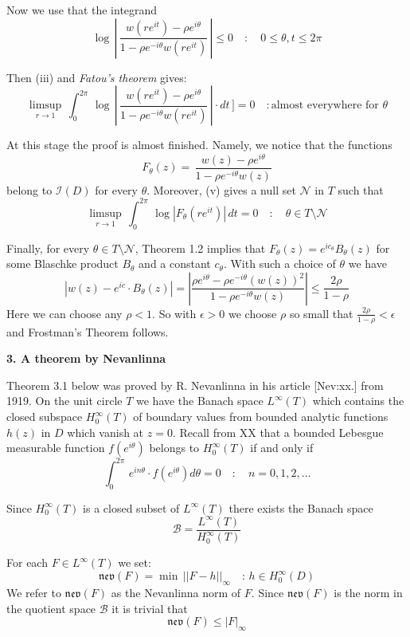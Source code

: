\documentclass{amsart}
\begin{document}
\noindent
Now we use that the  integrand
\[
\log\,|\,\frac{w(re^{it})-
\rho e^{i\theta}}{1-\rho e^{-i\theta}w(re^{it})}\,|\leq 0\quad\colon\quad
0\leq \theta,t\leq 2\pi\tag{iv}
\]
\medskip

\noindent
Then (iii) and  \emph{Fatou's theorem} gives:
\[
\limsup_{r\to 1}\,
\int_0^{2\pi}\,\log\,|
\,\frac{w(re^{it})-\rho e^{i\theta}}{1-\rho e^{-i\theta}w(re^{it})}\,|
\cdot dt\,]=0\quad\colon\text{almost everywhere for}\,\,\theta\tag{v}
\]


\noindent
At this stage the proof is almost finished. 
Namely, we notice that the functions
\[ 
F_\theta(z)=\,\frac{w(z)-\rho e^{i\theta}}{1-\rho e^{-i\theta}w(z)}
\]
belong to $\mathcal I(D)$ 
for every $\theta$. Moreover, (v) gives a null set $\mathcal N$
in $T$ such that
\[
\limsup_{r\to 1}\,
\int_0^{2\pi}\,
\log|F_\theta(re^{it})|\, dt=0
\quad\colon\quad \theta\in T\setminus\mathcal N\tag{vi}
\]


\noindent
Finally, for  every $\theta\in T\setminus\mathcal N$, Theorem 1.2 
implies that $F_\theta(z)=e^{ic_\theta}B_\theta(z)$ for
some Blaschke product $B_\theta$ and a constant $c_\theta$.
With such a choice of
$\theta$ we have
\[
|w(z)-e^{ic}\cdot B_\theta(z)|=
|\frac{\rho e^{i\theta}-\rho e^{-i\theta}(w(z))^2}{
1-\rho e^{-i\theta} w(z)}|\leq
\frac{2\rho}{1-\rho}\tag{vii}
\]
Here we can choose any $\rho<1$. So with  $\epsilon>0$
we choose $\rho$ so small that
$\frac{2\rho}{1-\rho}<\epsilon$ and 
Frostman's Theorem follows.


\bigskip


\centerline{\bf 3. A theorem by Nevanlinna}
\bigskip

\noindent
Theorem 3.1 below was proved by
R. Nevanlinna in his article [Nev:xx.] from 1919.
On the unit circle $T$ we have the Banach space
$L^\infty(T)$ which 
contains the 
closed  subspace $H_0^\infty(T)$
of boundary values from
bounded analytic functions $h(z)$ in $D$ which vanish
at $z=0$. 
Recall from XX that a 
bounded Lebesgue measurable function $f(e^{i\theta})$
belongs to $H_0^\infty(T)$ if and only if
\[
\int_0^{2\pi}\, e^{in\theta}\cdot f(e^{i\theta})d\theta=0
\quad\colon\quad n=0,1,2,\ldots\tag{0.1}
\]


\noindent
Since
$H_0^\infty(T)$ is a closed subset of $L^\infty(T)$
there exists the Banach space
\[
\mathcal B=\frac{L^\infty(T)}{H_0^\infty(T)}\tag{0.2}
\]


\noindent
For each $F\in L^\infty (T)$ we set:
\[ 
\mathfrak{nev}(F)=\min\,||F-h||_\infty\quad\colon\, h\in H_0^\infty(D)
\tag{0.3}
\]
\medskip
\noindent
We refer to $\mathfrak{nev}(F)$ as the Nevanlinna norm of $F$.
Since $\mathfrak{nev}(F)$
is the norm in the quotient space $\mathcal B$ it is trivial that
\[
\mathfrak{nev}(F)\leq |F|_\infty\tag{*}
\]
\end{document}
